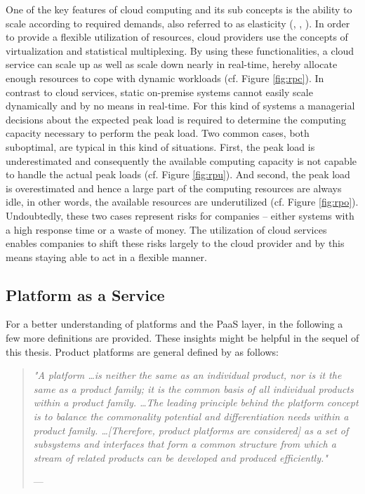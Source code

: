 One of the key features of cloud computing and its sub concepts is the ability to scale according to required demands, also referred to as elasticity (\citet{Armbrust2010}, \citet{Iyer2010}, \citet{Mell2011}). In order to provide a flexible utilization of resources, cloud providers use the concepts of virtualization and statistical multiplexing. By using these functionalities, a cloud service can scale up as well as scale down nearly in real-time, hereby allocate enough resources to cope with dynamic workloads (cf. Figure \ref{fig:rpc}). In contrast to cloud services, static on-premise systems cannot easily scale dynamically and by no means in real-time. For this kind of systems a managerial decisions about the expected peak load is required to determine the computing capacity necessary to perform the peak load. Two common cases, both suboptimal, are typical in this kind of situations. First, the peak load is underestimated and consequently the available computing capacity is not capable to handle the actual peak loads (cf. Figure \ref{fig:rpu}). And second, the peak load is overestimated and hence a large part of the computing resources are always idle, in other words, the available resources are underutilized (cf. Figure \ref{fig:rpo}). Undoubtedly, these two cases represent risks for companies -- either systems with a high response time or a waste of money. The utilization of cloud services enables companies to shift these risks largely to the cloud provider and by this means staying able to act in a flexible manner.



\subsection{Platform as a Service}

For a better understanding of platforms and the \ac{PaaS} layer, in the following a few more definitions are provided. These insights might be helpful in the sequel of this thesis. Product platforms are general defined by \citet{Halman2003} as follows:

\begin{quote}{\slshape 
"A platform \ldots is neither the same as an individual product, nor is it the same as a product family; it is the common basis of all individual products within a product family. \ldots The leading principle behind the platform concept is to balance the commonality potential and differentiation needs within a product family. \ldots [Therefore, product platforms are considered] as a set of subsystems and interfaces that form a common structure from which a stream of related products can be developed and produced efficiently."}
\vspace*{-7pt}
\begin{flushright}
	--- \citet[pp. 150-151]{Halman2003}
\end{flushright}
\end{quote}

